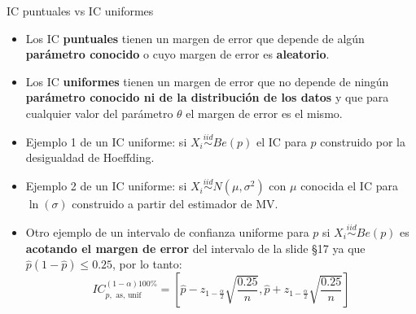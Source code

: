 \documentclass{beamer}
\theoremstyle{definition}
\begin{document}
\begin{frame}{\color{rosee}IC puntuales vs IC uniformes}
\small
\begin{itemize}

\item Los IC \textbf{puntuales} tienen un margen de error que depende de algún \textbf{parámetro conocido} o cuyo margen de error es \textbf{aleatorio}. 

\item Los IC \textbf{uniformes} tienen un margen de error que no depende de ningún \textbf{parámetro conocido ni de la distribución de los datos} y que para cualquier valor del parámetro $\theta$ el margen de error es el mismo.

\item Ejemplo 1 de un IC uniforme: si $X_i\stackrel{iid}{\sim}Be(p)$ el IC para $p$ construido por la desigualdad de Hoeffding.

\item Ejemplo 2 de un IC uniforme: si $X_i\stackrel{iid}{\sim}N(\mu,\sigma^2)$ con $\mu$ conocida el IC para $\ln(\sigma)$ construido a partir del estimador de MV.

\item Otro ejemplo de un intervalo de confianza uniforme para $p$ si $X_i\stackrel{iid}{\sim}Be(p)$ es \textbf{acotando el margen de error} del intervalo de la slide \S17 ya que $\widehat{p}(1-\widehat{p})\leq 0.25$, por lo tanto: 
\[IC_{p,\text{ as, unif}}^{(1-\alpha)100\%}=\left[ \hat{p}-z_{1-\frac{\alpha}{2}}\sqrt{\frac{0.25}{n}} ,
      \hat{p} + z_{1-\frac{\alpha}{2}}\sqrt{\frac{0.25}{n}}\right]\]
\end{itemize}
\end{frame}
\end{document}
